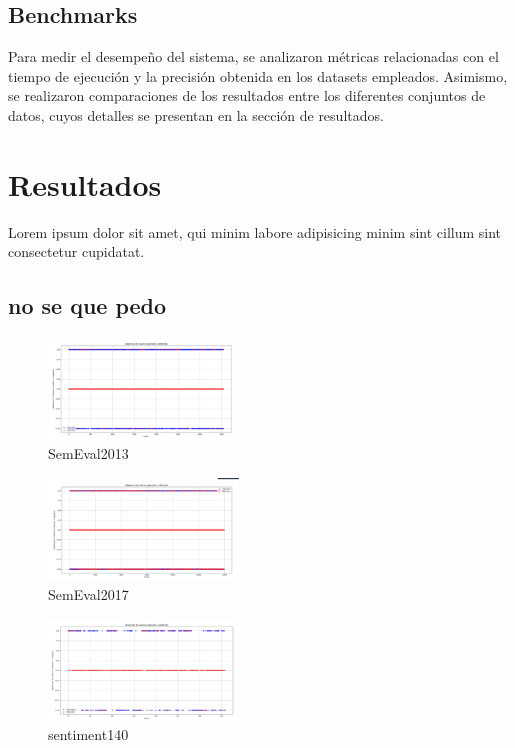 \documentclass[sigconf, review=false, nonacm]{acmart}
\begin{document}
\subsection{Benchmarks}
Para medir el desempeño del sistema, se analizaron métricas relacionadas
con el tiempo de ejecución y la precisión obtenida en los datasets empleados.
Asimismo, se realizaron comparaciones de los resultados entre los diferentes conjuntos de datos,
cuyos detalles se presentan en la sección de resultados.

\section{Resultados}
Lorem ipsum dolor sit amet, qui minim labore adipisicing minim sint cillum sint consectetur cupidatat.

\subsection{no se que pedo}
\begin{figure}[ht]
    \centering
    \includegraphics[width=0.45\textwidth]{../results/dispersion/semeval2013.png}
    \caption{SemEval2013}
    \label{fig:miimagen}
\end{figure}

\begin{figure}[ht]
    \centering
    \includegraphics[width=0.45\textwidth]{../results/dispersion/semeval2017.png}
    \caption{SemEval2017}
    \label{fig:miimagen}
\end{figure}

\begin{figure}[ht]
    \centering
    \includegraphics[width=0.45\textwidth]{../results/dispersion/sentiment140.png}
    \caption{sentiment140}
    \label{fig:miimagen}
\end{figure}
\end{document}
